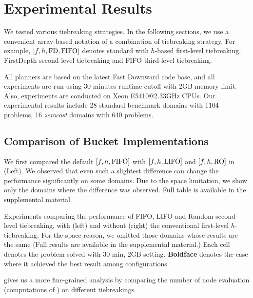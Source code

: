 \section{Experimental Results}


We tested various tiebreaking strategies. In the following sections, we
use a convenient array-based notation of a combination of tiebreaking
strategy.  For example, $[f,h,\mbox{FD},\mbox{FIFO}]$ denotes standard \astar with
$h$-based first-level tiebreaking, FirstDepth second-level tiebreaking and FIFO
third-level tiebreaking.

All planners are based on the latest Fast Downward code base, and all
experiments are run using 30 minutes runtime cutoff with 2GB memory
limit. Also, experiments are conducted on Xeon E5410@2.33GHz CPUs.
Our experimental results include 28 standard benchmark domains with 1104
problems, 16 \emph{zerocost} domains with 640 problems.

% 
% 
% 
% 

\subsection{Comparison of Bucket Implementations}

We first compared the default $[f,h,\mbox{FIFO}]$ with $[f,h,\mbox{LIFO}]$ and
$[f,h,\mbox{RO}]$ in  (Left).  We observed that even
such a slightest difference can change the performance significantly on
some domains. Due to the space limitation, we show only the domains
where the difference was observed. Full table is available in the
supplemental material.

\begin{table}[htbp]
 \centering {}
 
 
 \caption{Experiments comparing the performance of FIFO, LIFO and Random
 second-level tiebreaking, with (left) and without (right) the
 conventional first-level $h$-tiebreaking.  For the space reason, we
 omitted those domains whose results are the same (Full results are
 available in the supplemental material.) Each cell denotes the problem
 solved with 30 min, 2GB setting. \textbf{Boldface} denotes the case
 where it achieved the best result among configurations.}
 \label{single-coverage}
\end{table}

 gives us a more fine-grained analysis by comparing the
number of node evaluation (computations of \lmcut) on
different tiebreakings.

